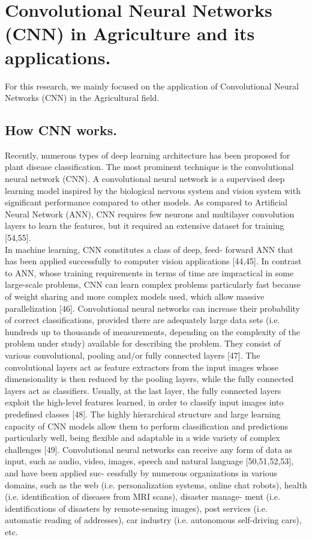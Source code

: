 \documentclass[11pt]{report}
\begin{document}
\section{Convolutional Neural Networks (CNN) in Agriculture and its applications.}
For this research, we mainly focused on the application of Convolutional Neural Networks (CNN) in the Agricultural field.\\

\subsection{How CNN works.}
Recently, numerous types of deep learning architecture has been proposed for plant
disease classification. The most prominent technique is the convolutional neural network
(CNN). A convolutional neural network is a supervised deep learning model inspired by
the biological nervous system and vision system with significant performance compared
to other models. As compared to Artificial Neural Network (ANN), CNN requires few
neurons and multilayer convolution layers to learn the features, but it required an extensive
dataset for training [54,55].\\

In machine learning, CNN constitutes a class of deep, feed-
forward ANN that has been applied successfully to computer
vision applications [44,45].
In contrast to ANN, whose training requirements in terms of
time are impractical in some large-scale problems, CNN can learn
complex problems particularly fast because of weight sharing and
more complex models used, which allow massive parallelization [46]. Convolutional neural networks can
increase their probability of correct classifications, provided
there are adequately large data sets (i.e. hundreds up to thousands
of measurements, depending on the complexity of the problem
under study) available for describing the problem. They consist
of various convolutional, pooling and/or fully connected layers
[47]. The convolutional layers act as feature
extractors from the input images whose dimensionality is then
reduced by the pooling layers, while the fully connected layers
act as classifiers. Usually, at the last layer, the fully connected
layers exploit the high-level features learned, in order to classify
input images into predefined classes [48].
The highly hierarchical structure and large learning capacity of
CNN models allow them to perform classification and predictions
particularly well, being flexible and adaptable in a wide variety of
complex challenges [49].
Convolutional neural networks can receive any form of data as
input, such as audio, video, images, speech and natural language
[50,51,52,53], and have been applied suc-
cessfully by numerous organizations in various domains, such as
the web (i.e. personalization systems, online chat robots), health
(i.e. identification of diseases from MRI scans), disaster manage-
ment (i.e. identifications of disasters by remote-sensing images),
post services (i.e. automatic reading of addresses), car industry
(i.e. autonomous self-driving cars), etc.
\end{document}
